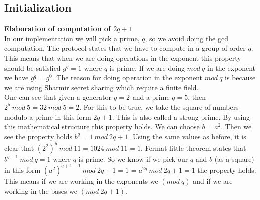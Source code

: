 \subsection{Initialization} \label{sec:protocol_details_initialization}
\textbf{Elaboration of computation of  $2q+1$}\\
In our implementation we will pick a prime, \begin{math}q\end{math}, so we avoid doing the gcd computation. The protocol states that we have to compute in a group of order $q$. This means that when we are doing operations in the exponent this property should be satisfied \begin{math}g^q=1\end{math} where \begin{math}q\end{math} is prime. If we are doing \begin{math}mod \ q \end{math} in the exponent we have \begin{math}g^q=g^0\end{math}. The reason for doing operation in the exponent \begin{math}mod \ q\end{math} is because we are using Sharmir secret sharing which require a finite field.\\

\noindent
One can see that given a generator $g=2 $ and a prime $q=5$, then \begin{math}2^5 \ mod \ 5 = 32 \ mod \ 5 = 2\end{math}. For this to be true, we take the square of numbers modulo a prime in this form \begin{math}2q+1\end{math}. This is also called a strong prime. By using this mathematical structure this property holds. We can choose \begin{math}b=a^2\end{math}. Then we see the property holds \begin{math}b^{q} = 1 \ mod \ 2q+1\end{math}. Using the same values as before, it is clear that \begin{math}(2^2)^5 \ mod \ 11 = 1024 \ mod \ 11 = 1\end{math}. Fermat little theorem states that \begin{math}b^{q-1} \ mod \ q = 1\end{math} where \begin{math}q\end{math} is prime. So we know if we pick our \begin{math}q\end{math} and \begin{math}b\end{math} (as a square)  in this form \begin{math}(a^{2})^{q+1-1} \ mod \ 2q+1 =1 =  a^{2q} \ mod \ 2q+1 =1\end{math} the property holds. This means if we are working in the exponents we $(mod \ q)$ and if we are working in the bases we $(mod \ 2q+1)$.\\

